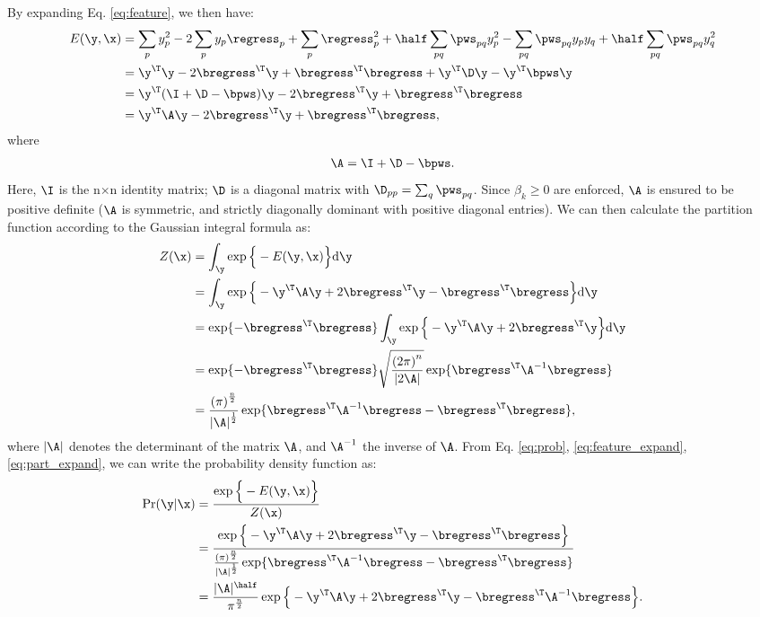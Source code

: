 By expanding Eq. \eqref{eq:feature}, we then have:
\begin{align} \label{eq:feature_expand}
E(\y, \x) &= \sum_p y_p^2 - 2\sum_p y_p \regress_p  + \sum_p \regress_p^2 + \half \sum_{pq} \pws_{pq} y_p^2 - \sum_{pq} \pws_{pq} y_p y_q + \half \sum_{pq} \pws_{pq} y_q^2 \notag \\
	&= \y^\T \y - 2\bregress^\T \y  + \bregress^\T \bregress +  \y^\T \D \y -  \y^\T \bpws \y  \notag \\
	&= \y^\T (\I+ \D - \bpws) \y - 2\bregress^\T \y + \bregress^\T \bregress \notag \\
	&= \y^\T \A \y - 2\bregress^\T \y + \bregress^\T \bregress,
\end{align}
where
\begin{align} \label{eq:def_A}
\A = \I+ \D - \bpws.
\end{align}
Here, $\I$ is the n$\times$n identity matrix; $\D$ is a diagonal matrix with $\D_{pp} = \sum_q \pws_{pq}$.
Since $\beta_k \geq 0$ are enforced, $\A$ is ensured to be positive definite ($\A$ is symmetric, and strictly diagonally dominant with positive diagonal entries). We can then calculate the partition function according to the Gaussian integral formula as:
\begin{align} \label{eq:part_expand}
Z(\x) &=\int_\y \exp \Big\{ -E(\y, \x) \Big\}\mathrm{d}\y   \notag \\
	&=  \int_{\y} \exp \Big\{ - \y^\T \A \y + 2\bregress^\T \y - \bregress^\T \bregress \Big\}\mathrm{d}\y  \notag  \\
	&=\exp \{  - \bregress^\T \bregress \} \int_{\y} \exp \Big\{ - \y^\T \A \y + 2\bregress^\T \y \Big\}\mathrm{d}\y \notag  \\
	&= \exp \{  - \bregress^\T \bregress \}\sqrt{\frac{{(2\pi)}^n}{|2\A|}} \exp \{{ \bregress ^\T \A^{-1} \bregress}\} \notag  \\
	&= \frac{{(\pi)}^{\frac{n}{2}}}{{|\A|}^{\frac{1}{2}}} \exp \{{ \bregress ^\T \A^{-1} \bregress   - \bregress^\T \bregress }\} ,
\end{align}
where $|\A|$ denotes the determinant of the matrix $\A$, and $\A^{-1}$ the inverse of $\A$.
From Eq. \eqref{eq:prob}, \eqref{eq:feature_expand}, \eqref{eq:part_expand}, we can write the probability density function as:
\begin{align} \label{eq:prob_gaussian}
\Pr(\y|\x) &=\frac{\exp \Big\{ -E(\y, \x) \Big\}} { Z(\x)}  \\ \notag
	&= \frac{\exp \Big\{ - \y^\T \A \y + 2\bregress^\T \y - \bregress^\T \bregress \Big\}}{\frac{{(\pi)}^{\frac{n}{2}}}{{|\A|}^{\frac{1}{2}}} \exp \{{ \bregress ^\T \A^{-1} \bregress   - \bregress^\T \bregress }\}}  \\ \notag
	&=\frac{ |\A|^{\half}} {{\pi^{\frac{n}{2}}}} \exp \Big\{ - \y^\T \A \y + 2\bregress^\T \y -  \bregress ^\T \A^{-1} \bregress \Big\}. \\ \notag
\end{align}
